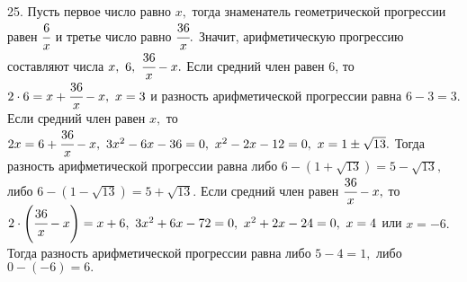 25. Пусть первое число равно $x,$ тогда знаменатель геометрической прогрессии равен $\cfrac{6}{x}$ и третье число равно $\cfrac{36}{x}.$ Значит, арифметическую прогрессию составляют числа $x,\ 6,\ \cfrac{36}{x}-x.$ Если средний член равен 6, то $2\cdot6=x+\cfrac{36}{x}-x,\ x=3$ и разность арифметической прогрессии равна $6-3=3.$ Если средний член равен $x,$ то $2x=6+\cfrac{36}{x}-x,\ 3x^2-6x-36=0,\ x^2-2x-12=0,\ x=1\pm\sqrt{13}.$ Тогда разность арифметической прогрессии равна либо $6-(1+\sqrt{13})=5-\sqrt{13},$ либо $6-(1-\sqrt{13})=5+\sqrt{13}.$ Если средний член равен $\cfrac{36}{x}-x,$ то $2\cdot\left(\cfrac{36}{x}-x\right)=x+6,\ 3x^2+6x-72=0,\ x^2+2x-24=0,\ x=4$ или $x=-6.$ Тогда разность арифметической прогрессии равна либо $5-4=1,$ либо $0-(-6)=6.$\\

